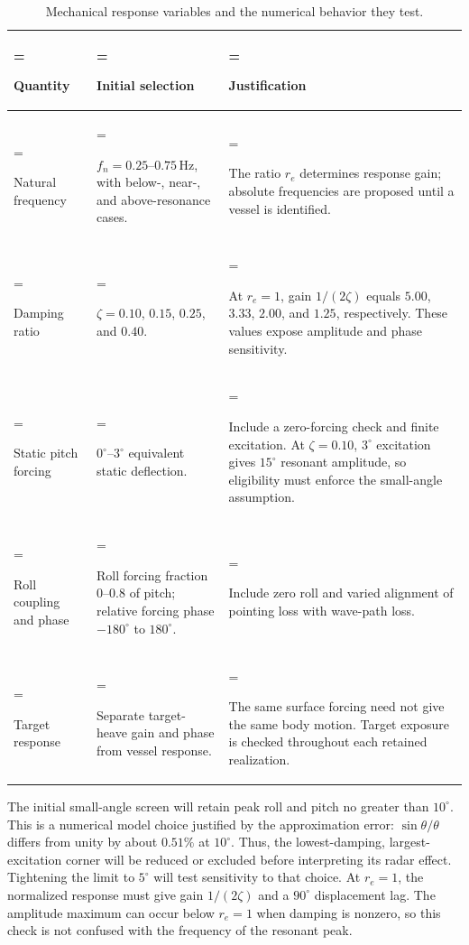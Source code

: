 \documentclass[10pt,letterpaper]{article}
\begin{document}
\begin{table}[H]
\centering
\caption{Mechanical response variables and the numerical behavior they test.}
\label{tab:response-choices}
\small
\begin{tabularx}{\textwidth}{@{}>{\hsize=0.7\hsize\linewidth=\hsize\raggedright\arraybackslash}X>{\hsize=1.0\hsize\linewidth=\hsize\raggedright\arraybackslash}X>{\hsize=1.3\hsize\linewidth=\hsize\raggedright\arraybackslash}X@{}}
\toprule
Quantity & Initial selection & Justification \\
\midrule
Natural frequency & $f_n=0.25$--$0.75\,\mathrm{Hz}$, with below-, near-, and above-resonance cases. & The ratio $r_e$ determines response gain; absolute frequencies are proposed until a vessel is identified. \\
Damping ratio & $\zeta=0.10$, $0.15$, $0.25$, and $0.40$. & At $r_e=1$, gain $1/(2\zeta)$ equals $5.00$, $3.33$, $2.00$, and $1.25$, respectively. These values expose amplitude and phase sensitivity. \\
Static pitch forcing & $0^\circ$--$3^\circ$ equivalent static deflection. & Include a zero-forcing check and finite excitation. At $\zeta=0.10$, $3^\circ$ excitation gives $15^\circ$ resonant amplitude, so eligibility must enforce the small-angle assumption. \\
Roll coupling and phase & Roll forcing fraction $0$--$0.8$ of pitch; relative forcing phase $-180^\circ$ to $180^\circ$. & Include zero roll and varied alignment of pointing loss with wave-path loss. \\
Target response & Separate target-heave gain and phase from vessel response. & The same surface forcing need not give the same body motion. Target exposure is checked throughout each retained realization. \\
\bottomrule
\end{tabularx}
\end{table}

The initial small-angle screen will retain peak roll and pitch no greater than $10^\circ$. This is a numerical model choice justified by the approximation error: $\sin\theta/\theta$ differs from unity by about $0.51\%$ at $10^\circ$. Thus, the lowest-damping, largest-excitation corner will be reduced or excluded before interpreting its radar effect. Tightening the limit to $5^\circ$ will test sensitivity to that choice. At $r_e=1$, the normalized response must give gain $1/(2\zeta)$ and a $90^\circ$ displacement lag. The amplitude maximum can occur below $r_e=1$ when damping is nonzero, so this check is not confused with the frequency of the resonant peak.
\end{document}
